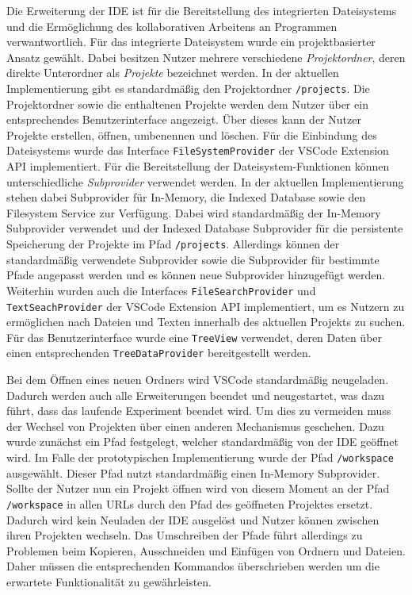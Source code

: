 Die Erweiterung der IDE ist für die Bereitstellung des integrierten Dateisystems und die Ermöglichung des kollaborativen Arbeitens an Programmen verwantwortlich. Für das integrierte Dateisystem wurde ein projektbasierter Ansatz gewählt. Dabei besitzen Nutzer mehrere verschiedene \textit{Projektordner}, deren direkte Unterordner als \textit{Projekte} bezeichnet werden. In der aktuellen Implementierung gibt es standardmäßig den Projektordner \texttt{/projects}. Die Projektordner sowie die enthaltenen Projekte werden dem Nutzer über ein entsprechendes Benutzerinterface angezeigt. Über dieses kann der Nutzer Projekte erstellen, öffnen, umbenennen und löschen. Für die Einbindung des Dateisystems wurde das Interface \texttt{FileSystemProvider} der VSCode Extension API implementiert. Für die Bereitstellung der Dateisystem-Funktionen können unterschiedliche \textit{Subprovider} verwendet werden. In der aktuellen Implementierung stehen dabei Subprovider für In-Memory, die Indexed Database sowie den Filesystem Service zur Verfügung. Dabei wird standardmäßig der In-Memory Subprovider verwendet und der Indexed Database Subprovider für die persistente Speicherung der Projekte im Pfad \texttt{/projects}. Allerdings können der standardmäßig verwendete Subprovider sowie die Subprovider für bestimmte Pfade angepasst werden und es können neue Subprovider hinzugefügt werden. Weiterhin wurden auch die Interfaces \texttt{FileSearchProvider} und \texttt{TextSeachProvider} der VSCode Extension API implementiert, um es Nutzern zu ermöglichen nach Dateien und Texten innerhalb des aktuellen Projekts zu suchen. Für das Benutzerinterface wurde eine \texttt{TreeView} verwendet, deren Daten über einen entsprechenden \texttt{TreeDataProvider} bereitgestellt werden.

Bei dem Öffnen eines neuen Ordners wird VSCode standardmäßig neugeladen. Dadurch werden auch alle Erweiterungen beendet und neugestartet, was dazu führt, dass das laufende Experiment beendet wird. Um dies zu vermeiden muss der Wechsel von Projekten über einen anderen Mechanismus geschehen. Dazu wurde zunächst ein Pfad festgelegt, welcher standardmäßig von der IDE geöffnet wird. Im Falle der prototypischen Implementierung wurde der Pfad \texttt{/workspace} ausgewählt. Dieser Pfad nutzt standardmäßig einen In-Memory Subprovider. Sollte der Nutzer nun ein Projekt öffnen wird von diesem Moment an der Pfad \texttt{/workspace} in allen URLs durch den Pfad des geöffneten Projektes ersetzt. Dadurch wird kein Neuladen der IDE ausgelöst und Nutzer können zwischen ihren Projekten wechseln. Das Umschreiben der Pfade führt allerdings zu Problemen beim Kopieren, Ausschneiden und Einfügen von Ordnern und Dateien. Daher müssen die entsprechenden Kommandos überschrieben werden um die erwartete Funktionalität zu gewährleisten.

